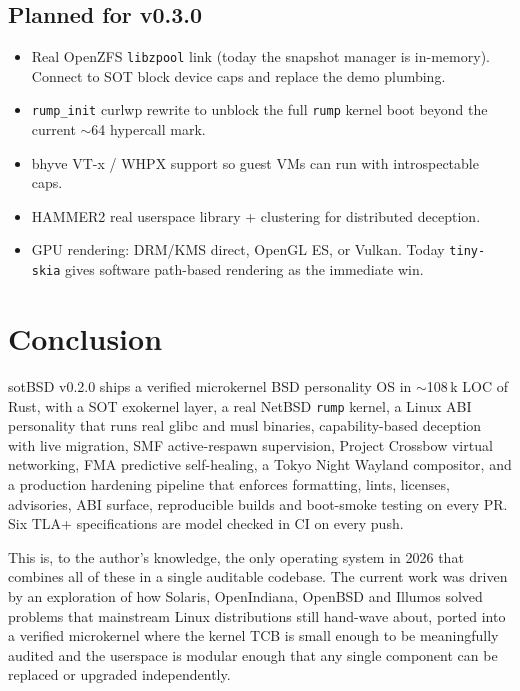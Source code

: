 \documentclass[11pt,a4paper]{article}
\begin{document}
\subsection{Planned for v0.3.0}

\begin{itemize}[leftmargin=1.4em,itemsep=0.3em]
  \item Real OpenZFS \texttt{libzpool} link (today the snapshot
        manager is in-memory). Connect to SOT block device caps and
        replace the demo plumbing.
  \item \texttt{rump\_init} curlwp rewrite to unblock the full
        \texttt{rump} kernel boot beyond the current $\sim$64
        hypercall mark.
  \item bhyve VT-x / WHPX support so guest VMs can run with
        introspectable caps.
  \item HAMMER2 real userspace library + clustering for
        distributed deception.
  \item GPU rendering: DRM/KMS direct, OpenGL ES, or Vulkan. Today
        \texttt{tiny-skia} gives software path-based rendering as
        the immediate win.
\end{itemize}

\section{Conclusion}

sotBSD v0.2.0 ships a verified microkernel BSD personality OS in
$\sim$108\,k LOC of Rust, with a SOT exokernel layer, a real NetBSD
\texttt{rump} kernel, a Linux ABI personality that runs real glibc
and musl binaries, capability-based deception with live migration,
SMF active-respawn supervision, Project Crossbow virtual networking,
FMA predictive self-healing, a Tokyo Night Wayland compositor, and a
production hardening pipeline that enforces formatting, lints,
licenses, advisories, ABI surface, reproducible builds and
boot-smoke testing on every PR. Six TLA+ specifications are model
checked in CI on every push.

This is, to the author's knowledge, the only operating system in 2026
that combines all of these in a single auditable codebase. The current
work was driven by an exploration of how Solaris, OpenIndiana, OpenBSD
and Illumos solved problems that mainstream Linux distributions still
hand-wave about, ported into a verified microkernel where the kernel
TCB is small enough to be meaningfully audited and the userspace is
modular enough that any single component can be replaced or
upgraded independently.
\end{document}
